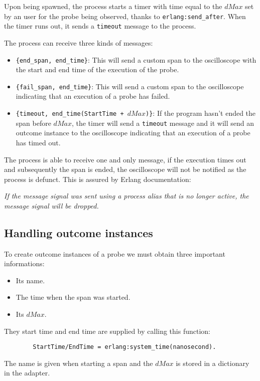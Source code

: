            Upon being spawned, the process starts a timer with time equal to the $dMax$ set by an user for the probe being observed, thanks to \texttt{erlang:send\_after}. When the timer runs out, it sends a \texttt{timeout} message to the process.
        
        The process can receive three kinds of messages:
        \begin{itemize}
            \item \texttt{\{end\_span, end\_time\}}: This will send a custom span to the oscilloscope with the start and end time of the execution of the probe.
            \item \texttt{\{fail\_span, end\_time\}}: This will send a custom span to the oscilloscope indicating that an execution of a probe has failed.
            \item \texttt{\{timeout, end\_time(StartTime + $dMax$)\}}: If the program hasn't ended the span before $dMax$, the timer will send a \texttt{timeout} message and it will send an outcome instance to the oscilloscope indicating that an execution of a probe has timed out.
        \end{itemize}
        The process is able to receive one and only message, if the execution times out and subsequently the span is ended, the oscilloscope will not be notified as the process is defunct. This is assured by Erlang documentation:
        \begin{center}
            \textit{If the message signal was sent using a process alias that is no longer active, the message signal will be dropped.} \cite{erl-s}
        \end{center}

    \subsection{Handling outcome instances}
        To create outcome instances of a probe we must obtain three important informations:
        \begin{itemize}
            \item Its name.
            \item The time when the span was started.
            \item Its $dMax$.
        \end{itemize}
        
        They start time and end time are supplied by calling this function:
        \begin{verbatim}
        StartTime/EndTime = erlang:system_time(nanosecond).
        \end{verbatim}
        The name is given when starting a span and the $dMax$ is stored in a dictionary in the adapter. 

